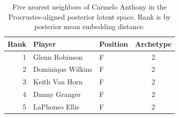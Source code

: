 \begin{table}[htbp]
  \centering\small
  \begin{tabular}{rllc}
    \toprule
    Rank & Player & Position & Archetype \\
    \midrule
    1 & Glenn Robinson & F & 2 \\
    2 & Dominique Wilkins & F & 2 \\
    3 & Keith Van Horn & F & 2 \\
    4 & Danny Granger & F & 2 \\
    5 & LaPhonso Ellis & F & 2 \\
    \bottomrule
  \end{tabular}
  \caption{Five nearest neighbors of Carmelo Anthony in the Procrustes-aligned posterior latent space. Rank is by posterior mean embedding distance.}
  \label{tab:Carmelo_Anthony_neighbors}
\end{table}

